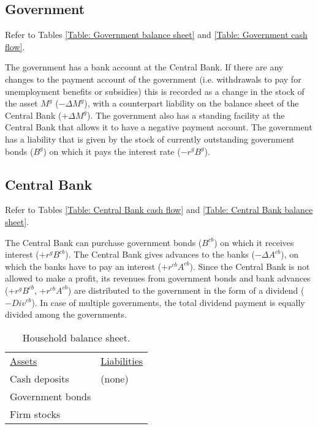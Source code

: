 \subsection{Government}
Refer to Tables \ref{Table: Government balance sheet} and \ref{Table: Government cash flow}.

The government has a bank account at the Central Bank. If there are any changes to the payment account of the government (i.e. withdrawals to pay for unemployment benefits or subsidies) this is recorded as a change in the stock of the asset $M^{g}$ ($-\Delta M^{g}$), with a counterpart liability on the balance sheet of the Central Bank ($+\Delta M^{g}$). The government also has a standing facility at the Central Bank that allows it to have a negative payment account. The government has a liability that is given by the stock of currently outstanding government bonds ($B^g$) on which it pays the interest rate ($-r^g B^g$).

\subsection{Central Bank}
Refer to Tables \ref{Table: Central Bank cash flow} and \ref{Table: Central Bank balance sheet}.

The Central Bank can purchase government bonds ($B^{cb}$) on which it receives interest ($+r^{g}B^{cb}$).
The Central Bank gives advances to the banks ($-\Delta A^{cb}$), on which the banks have to pay an interest ($+r^{cb}A^{cb}$). Since the Central Bank is not allowed to make a profit, its revenues from government bonds and bank advances ($+r^{g}B^{cb}$, $+r^{cb}A^{cb}$) are distributed to the government in the form of a dividend ($-Div^{cb}$). In case of multiple governments, the total dividend payment is equally divided among the governments.

\clearpage
\begin{table}[H!]
\caption{Household balance sheet.}
\label{Table: Household balance sheet}\centering
\begin{boxedminipage}{14cm}
\centering\leavevmode
\begin{tabular}{ll}
\underline{Assets} & \underline{Liabilities} \\
Cash deposits & (none)\\
Government bonds &\\
Firm stocks &\\
\end{tabular}%
\end{boxedminipage}
\end{table}

